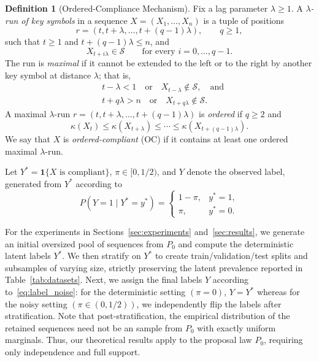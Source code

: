 \documentclass[fullpaper]{nldl}
\theoremstyle{plain}
\theoremstyle{definition}
\newtheorem{definition}[theorem]{Definition}
\theoremstyle{remark}
\begin{document}
\begin{definition}[Ordered-Compliance Mechanism]
\label{def:compliance}
Fix a lag parameter $\lambda \geq 1$. A \emph{$\lambda$-run of key symbols}
in a sequence $X=(X_1,\ldots,X_n)$ is a tuple of positions
\[
r=(t,t+\lambda,\ldots,t+(q-1)\lambda),
\qquad q\geq 1,
\]
such that $t \geq 1$ and $t+(q-1)\lambda\leq n$, and
\[
X_{t+i\lambda}\in\mathcal{S}
\qquad
\text{for every } i=0,\ldots,q-1.
\]
The run is \emph{maximal} if it cannot be extended to the left or to the right
by another key symbol at distance $\lambda$; that is,
\[
\begin{aligned}
&t-\lambda < 1
\quad\text{or}\quad
X_{t-\lambda}\notin\mathcal{S},
\quad\text{and}\\
&t+q\lambda > n
\quad\text{or}\quad
X_{t+q\lambda}\notin\mathcal{S}.
\end{aligned}
\]
A maximal $\lambda$-run $r=(t,t+\lambda,\ldots,t+(q-1)\lambda)$ is
\emph{ordered} if $q\geq 2$ and
\[
\kappa(X_t)
\leq
\kappa(X_{t+\lambda})
\leq
\cdots
\leq
\kappa(X_{t+(q-1)\lambda}).
\]
We say that $X$ is \emph{ordered-compliant} (OC) if it contains at least one ordered
maximal $\lambda$-run.
\end{definition}

Let $Y^*=\mathbf{1}\{X \text{ is compliant}\}$, $\pi\in[0,1/2)$, and
$Y$ denote the observed label, generated from $Y^*$ according to
\begin{equation}
\label{eq:label_noise}
P(Y=1\mid Y^*=y^*)=
\begin{cases}
1-\pi, & y^*=1,\\
\pi, & y^*=0.
\end{cases}
\end{equation}

For the experiments in Sections~\ref{sec:experiments} and~\ref{sec:results}, we generate an initial oversized pool of sequences \iid from $P_0$ and compute the deterministic latent labels $Y^*$. We then stratify on $Y^*$ to create train/validation/test splits and subsamples of varying size, strictly preserving the latent prevalence reported in Table~\ref{tab:datasets}. Next, we assign the final labels $Y$ according to~\eqref{eq:label_noise}: for the deterministic setting $(\pi = 0)$, $Y = Y^*$ whereas for the noisy setting $(\pi \in (0, 1/2))$, we independently flip the labels after stratification. Note that post-stratification, the empirical distribution of the retained sequences need not be an \iid sample from $P_0$ with exactly uniform marginals. Thus, our theoretical results apply to the proposal law $P_0$, requiring only independence and full support.
\end{document}
